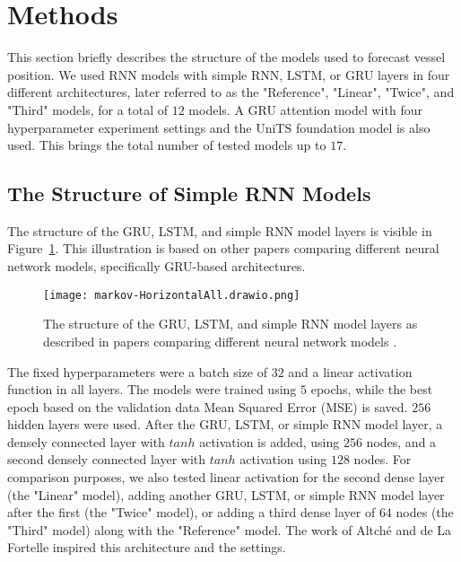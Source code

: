 \documentclass[preprint,12pt]{elsarticle}
\begin{document}
\section{Methods}
\label{sec:Methods}

This section briefly describes the structure of the models used to forecast vessel position. We used RNN models with simple RNN, LSTM, or GRU layers in four different architectures, later referred to as the "Reference", "Linear", "Twice", and "Third" models, for a total of $12$ models. A GRU attention model with four hyperparameter experiment settings and the UniTS foundation model is also used. This brings the total number of tested models up to $17$.

\subsection{The Structure of Simple RNN Models}
\label{subsec:RNN}
 
The structure of the GRU, LSTM, and simple RNN model layers is visible in Figure~\ref{fig:layers}. This illustration is based on other papers \cite{bao2023spatial, bao2022improved, agarap2018statistical,olah2015neural} comparing different neural network models, specifically GRU-based architectures.

\begin{figure}[!ht]
    \centering
    \texttt{[image: markov-HorizontalAll.drawio.png]}
    \caption{The structure of the GRU, LSTM, and simple RNN model layers as described in papers comparing different neural network models \cite{bao2023spatial, bao2022improved, agarap2018statistical,olah2015neural}.}
    \label{fig:layers}
\end{figure}
 
The fixed hyperparameters were a batch size of $32$ and a linear activation function in all layers. The models were trained using $5$ epochs, while the best epoch based on the validation data Mean Squared Error (MSE) is saved. $256$ hidden layers were used. After the GRU, LSTM, or simple RNN model layer, a densely connected layer with $tanh$ activation is added, using $256$ nodes, and a second densely connected layer with $tanh$ activation using $128$ nodes. For comparison purposes, we also tested linear activation for the second dense layer (the "Linear" model), adding another GRU, LSTM, or simple RNN model layer after the first (the "Twice" model), or adding a third dense layer of $64$ nodes (the "Third" model) along with the "Reference" model. The work of Altché and de La Fortelle \citep{altche2017lstm} inspired this architecture and the settings.
\end{document}
